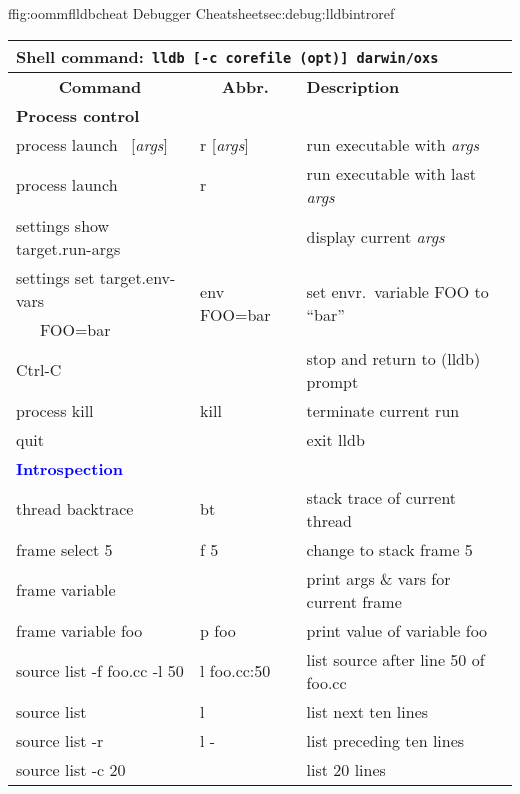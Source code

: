 \begin{codelisting}{f}{fig:oommflldbcheat}{ Debugger
    Cheatsheet\HTMLoutput{\phantom{\rule{1pt}{1.5\baselineskip}}}}{sec:debug:lldbintro}{ref}
  \begin{center}
    \begin{tabular}{|l|l|l|}\hline
  \multicolumn{3}{|l|}{\rule[-1ex]{0pt}{3ex}\textbf{Shell
      command:}\texttt{ lldb [-c corefile (opt)] darwin/oxs}}\\\hline
  \multicolumn{1}{|c}{\rule[-1ex]{0pt}{3.5ex}
    \textbf{Command}}
  & \multicolumn{1}{|c}{\textbf{Abbr.}}
  & \multicolumn{1}{|l|}{\textbf{Description}}\\\hline
  \multicolumn{3}{|l|}{
  \rule{0pt}{3ex}\textcolor[rgb]{0,0.7,0}{\textbf{Process control}}}\\\hline
  process launch \dblhyp\ [\textit{args}] & r [\textit{args}]
  & run executable with \textit{args}\\
  process launch & r &  run executable with last \textit{args}\\

  settings show target.run-args & & display current \textit{args}\\

  settings set target.env-vars & \multirow{2}{*}{env FOO=bar}
     & \multirow{2}{*}{set envr.\ variable FOO to ``bar''} \\
  ~~~FOO=bar && \\

  Ctrl-C & & stop and return to (lldb) prompt\\
  process kill & kill & terminate current run\\
  quit & & exit lldb\\\hline

  \multicolumn{3}{|l|}{
    \rule{0pt}{3ex}\textcolor{blue}{\textbf{Introspection}}}\\\hline
  thread backtrace & bt & stack trace of current thread\\

  frame select 5 & f 5 & change to stack frame 5\\
  frame variable &  & print args \& vars for current frame\\
  frame variable foo & p foo & print value of variable foo\\
  source list -f foo.cc -l 50 & l foo.cc:50 & list source after line 50 of foo.cc\\
  source list & l & list next ten lines\\
  source list -r & l - & list preceding ten lines\\
  source list -c 20 & & list 20 lines\\\hline


\end{tabular}
\end{center}
\end{codelisting}

